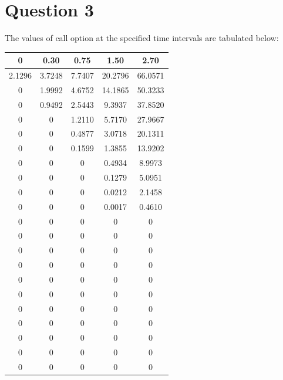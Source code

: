 \documentclass[12pt]{article}
\begin{document}
\section{Question 3}
The values of call option at the specified time intervals are tabulated below:\\
  \begin{center}
    \begin{tabular}{ccccc}
      0 &0.30 &0.75 &1.50 &2.70\\ \hline
      2.1296	&3.7248	&7.7407	&20.2796	&66.0571\\
      0	                &1.9992	&4.6752	&14.1865	&50.3233\\
      0	                &0.9492	&2.5443	&9.3937	&37.8520\\
      0	                &0	                &1.2110	&5.7170	&27.9667\\
      0	                &0	                &0.4877	&3.0718	&20.1311\\
      0	                &0	                &0.1599	&1.3855	&13.9202\\
      0	                &0	   &0	        &0.4934	&8.9973\\
      0	                &0	   &0	                &0.1279	&5.0951\\
      0	                &0	   &0	                &0.0212	&2.1458\\
      0	                &0	   &0	                &0.0017	&0.4610\\
      0	                &0	                &0	                &0	                &0\\
      0	                &0	                &0	                &0	                &0\\
      0	                &0	                &0	                &0	                &0\\
      0	                &0	                &0	                &0	                &0\\
      0	                &0	                &0	                &0	                &0\\
      0	                &0	                &0	                &0	                &0\\
      0	                &0	                &0	                &0	                &0\\
      0	                &0	                &0	                &0	                &0\\
      0	                &0	                &0	                &0	                &0\\
      0	                &0	                &0	                &0	                &0\\
      0	                &0	                &0	                &0	                &0\\ \hline
    \end{tabular}
  \end{center}
\end{document}
